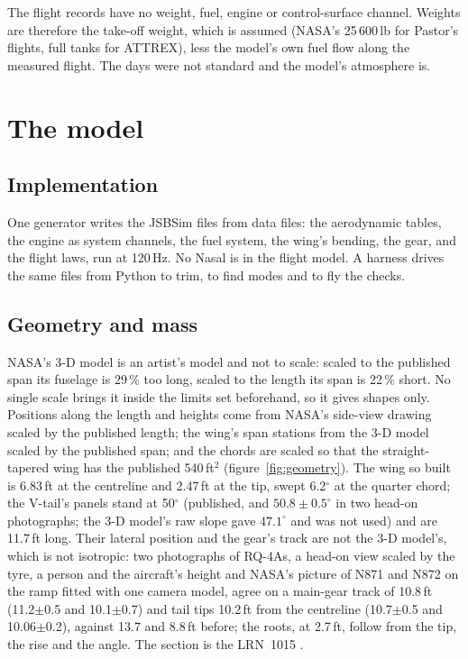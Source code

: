 \documentclass[10pt,a4paper,twocolumn]{article}
\begin{document}
The flight records have no weight, fuel, engine or control-surface channel. Weights are therefore the take-off weight, which is assumed (NASA's
25\,600\,lb for Pastor's flights, full tanks for ATTREX), less the model's own fuel flow along the measured flight. The days were not standard and the
model's atmosphere is.

\section{The model}\label{sec:model}
\subsection{Implementation}
One generator writes the JSBSim files from data files: the aerodynamic tables, the engine as system channels, the fuel system, the wing's bending, the
gear, and the flight laws, run at 120\,Hz. No Nasal is in the flight model. A harness drives the same files from Python to trim,
to find modes and to fly the checks.

\subsection{Geometry and mass}
NASA's 3-D model is an artist's model and not to scale: scaled to the published span its fuselage is 29\,\% too long, scaled to the length its span is
22\,\% short. No single scale brings it inside the limits set beforehand, so it gives shapes only. Positions along the length and heights come from NASA's
side-view drawing scaled by the published length; the wing's span stations from the 3-D model scaled by the published span; and the chords are scaled
so that the straight-tapered wing has the published 540\,ft$^2$ (figure~\ref{fig:geometry}). The wing so built is 6.83\,ft at the centreline and
2.47\,ft at the tip, swept 6.2$^\circ$ at the quarter chord; the V-tail's panels stand at 50$^\circ$ (published, and $50.8\pm0.5^\circ$ in two head-on photographs; the 3-D model's raw slope gave $47.1^\circ$ and was not used) and are 11.7\,ft long. Their lateral position and the gear's track are not the 3-D model's, which is not isotropic: two photographs of RQ-4As, a head-on view scaled by the tyre, a person and the aircraft's height and NASA's picture of N871 and N872 on the ramp fitted with one camera model, agree on a main-gear track of 10.8\,ft (11.2$\pm$0.5 and 10.1$\pm$0.7) and tail tips 10.2\,ft from the centreline (10.7$\pm$0.5 and 10.06$\pm$0.2), against 13.7 and 8.8\,ft before; the roots, at 2.7\,ft, follow from the tip, the rise and the angle. The section is the LRN~1015 \cite{lrn}.
\end{document}
